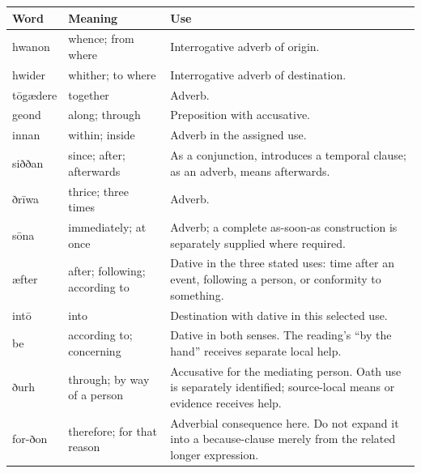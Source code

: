 \par\begingroup
\fontsize{10.5}{13.2}\selectfont
\setlength{\LTleft}{0pt}\setlength{\LTright}{\fill}
\noindent
\begin{tabular}{@{}>{\raggedright\arraybackslash}p{18.5mm}>{\raggedright\arraybackslash}p{26.31mm}>{\raggedright\arraybackslash}p{73.57mm}@{}}
\toprule
\textbf{Word} & \textbf{Meaning} & \textbf{Use} \\
\midrule
hwanon & whence; from where & Interrogative adverb of origin. \\
hwider & whither; to where & Interrogative adverb of destination. \\
tōgædere & together & Adverb. \\
geond & along; through & Preposition with accusative. \\
innan & within; inside & Adverb in the assigned use. \\
siððan & since; after; afterwards & As a conjunction, introduces a temporal clause; as an adverb, means afterwards. \\
ðrīwa & thrice; three times & Adverb. \\
sōna & immediately; at once & Adverb; a complete as-soon-as construction is separately supplied where required. \\
æfter & after; following; according to & Dative in the three stated uses: time after an event, following a person, or conformity to something. \\
intō & into & Destination with dative in this selected use. \\
be & according to; concerning & Dative in both senses. The reading’s “by the hand” receives separate local help. \\
ðurh & through; by way of a person & Accusative for the mediating person. Oath use is separately identified; source-local means or evidence receives help. \\
for-ðon & therefore; for that reason & Adverbial consequence here. Do not expand it into a because-clause merely from the related longer expression. \\
\bottomrule
\end{tabular}
\par\endgroup


